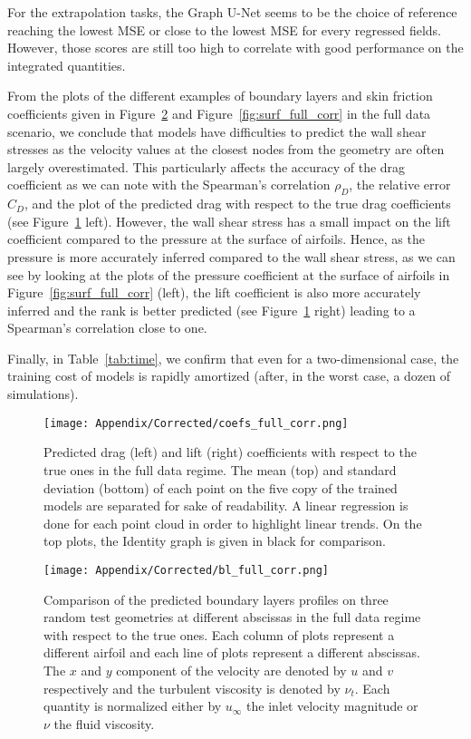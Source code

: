 For the extrapolation tasks, the Graph U-Net seems to be the choice of reference reaching the lowest \acrshort{MSE} or close to the lowest \acrshort{MSE} for every regressed fields. However, those scores are still too high to correlate with good performance on the integrated quantities.

From the plots of the different examples of boundary layers and skin friction coefficients given in Figure~\ref{fig:bl_full_corr} and Figure~\ref{fig:surf_full_corr} in the full data scenario, we conclude that models have difficulties to predict the wall shear stresses as the velocity values at the closest nodes from the geometry are often largely overestimated. This particularly affects the accuracy of the drag coefficient as we can note with the Spearman's correlation $\rho_D$, the relative error $C_D$, and the plot of the predicted drag with respect to the true drag coefficients (see Figure~\ref{fig:coefs_full_corr} left). However, the wall shear stress has a small impact on the lift coefficient compared to the pressure at the surface of airfoils. Hence, as the pressure is more accurately inferred compared to the wall shear stress, as we can see by looking at the plots of the pressure coefficient at the surface of airfoils in Figure~\ref{fig:surf_full_corr} (left), the lift coefficient is also more accurately inferred and the rank is better predicted (see Figure~\ref{fig:coefs_full_corr} right) leading to a Spearman's correlation close to one.

Finally, in Table~\ref{tab:time}, we confirm that even for a two-dimensional case, the training cost of models is rapidly amortized (after, in the worst case, a dozen of simulations).

\begin{figure}
	\centering
	\texttt{[image: Appendix/Corrected/coefs\_full\_corr.png]}
	\caption[Predicted force coefficients with respect to true one.]{Predicted drag (left) and lift (right) coefficients with respect to the true ones in the full data regime. The mean (top) and standard deviation (bottom) of each point on the five copy of the trained models are separated for sake of readability. A linear regression is done for each point cloud in order to highlight linear trends. On the top plots, the Identity graph is given in black for comparison.}
	\label{fig:coefs_full_corr}
\end{figure}

\begin{figure}
	\centering
	\texttt{[image: Appendix/Corrected/bl\_full\_corr.png]}
	\caption[Comparison of the predicted boundary layers profiles.]{Comparison of the predicted boundary layers profiles on three random test geometries at different abscissas in the full data regime with respect to the true ones. Each column of plots represent a different airfoil and each line of plots represent a different abscissas. The $x$ and $y$ component of the velocity are denoted by $u$ and $v$ respectively and the turbulent viscosity is denoted by $\nu_t$. Each quantity is normalized either by $u_\infty$ the inlet velocity magnitude or $\nu$ the fluid viscosity.}
	\label{fig:bl_full_corr}
\end{figure}

